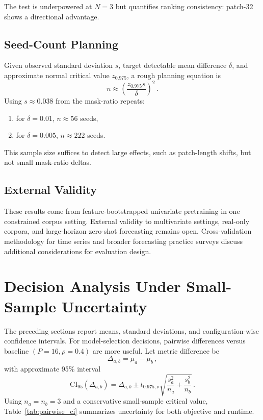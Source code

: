 \documentclass[journal]{IEEEtran}
\begin{document}
The test is underpowered at $N=3$ but quantifies ranking consistency: patch-32 shows a directional advantage.

\subsection{Seed-Count Planning}
Given observed standard deviation $s$, target detectable mean difference $\delta$, and approximate normal critical value $z_{0.975}$, a rough planning equation is
\begin{equation}
n \approx \left(\frac{z_{0.975} s}{\delta}\right)^2\,.
\label{eq:seed_plan}
\end{equation}
Using $s\approx0.038$ from the mask-ratio repeats:
\begin{enumerate}
    \item for $\delta=0.01$, $n\approx56$ seeds,
    \item for $\delta=0.005$, $n\approx222$ seeds.
\end{enumerate}
This sample size suffices to detect large effects, such as patch-length shifts, but not small mask-ratio deltas.

\subsection{External Validity}
These results come from feature-bootstrapped univariate pretraining in one constrained corpus setting. External validity to multivariate settings, real-only corpora, and large-horizon zero-shot forecasting remains open. Cross-validation methodology for time series \cite{bergmeir2018} and broader forecasting practice surveys \cite{petropoulos2022forecasting} discuss additional considerations for evaluation design.

\section{Decision Analysis Under Small-Sample Uncertainty}
The preceding sections report means, standard deviations, and configuration-wise confidence intervals. For model-selection decisions, pairwise differences versus baseline $(P=16,\rho=0.4)$ are more useful. Let metric difference be
\begin{equation}
\Delta_{a,b} = \mu_a - \mu_b\,,
\end{equation}
with approximate 95\% interval
\begin{equation}
\mathrm{CI}_{95}(\Delta_{a,b}) = \Delta_{a,b} \pm t_{0.975,\nu}\sqrt{\frac{s_a^2}{n_a}+\frac{s_b^2}{n_b}}\,.
\label{eq:pairwise_ci}
\end{equation}
Using $n_a=n_b=3$ and a conservative small-sample critical value, Table~\ref{tab:pairwise_ci} summarizes uncertainty for both objective and runtime.
\end{document}
